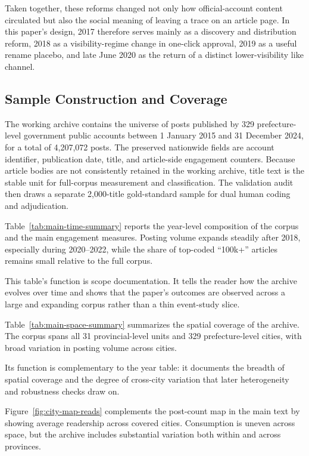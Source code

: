 \documentclass[12pt, american]{article}
\begin{document}
Taken together, these reforms changed not only how official-account content circulated but also the social meaning of leaving a trace on an article page. In this paper's design, 2017 therefore serves mainly as a discovery and distribution reform, 2018 as a visibility-regime change in one-click approval, 2019 as a useful rename placebo, and late June 2020 as the return of a distinct lower-visibility like channel.

\subsection{Sample Construction and Coverage}

The working archive contains the universe of posts published by 329 prefecture-level government public accounts between 1 January 2015 and 31 December 2024, for a total of 4,207,072 posts. The preserved nationwide fields are account identifier, publication date, title, and article-side engagement counters. Because article bodies are not consistently retained in the working archive, title text is the stable unit for full-corpus measurement and classification. The validation audit then draws a separate 2,000-title gold-standard sample for dual human coding and adjudication.

Table~\ref{tab:main-time-summary} reports the year-level composition of the corpus and the main engagement measures. Posting volume expands steadily after 2018, especially during 2020--2022, while the share of top-coded ``100k+'' articles remains small relative to the full corpus.

This table's function is scope documentation. It tells the reader how the archive evolves over time and shows that the paper's outcomes are observed across a large and expanding corpus rather than a thin event-study slice.



Table~\ref{tab:main-space-summary} summarizes the spatial coverage of the archive. The corpus spans all 31 provincial-level units and 329 prefecture-level cities, with broad variation in posting volume across cities.

Its function is complementary to the year table: it documents the breadth of spatial coverage and the degree of cross-city variation that later heterogeneity and robustness checks draw on.



Figure~\ref{fig:city-map-reads} complements the post-count map in the main text by showing average readership across covered cities. Consumption is uneven across space, but the archive includes substantial variation both within and across provinces.
\end{document}
